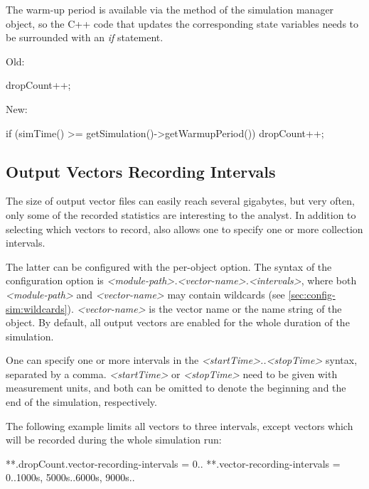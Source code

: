 The warm-up period is available via the  method of the
simulation manager object, so the C++ code that updates the corresponding state
variables needs to be surrounded with an \textit{if} statement.

Old:

\begin{cpp}
dropCount++;
\end{cpp}

New:

\begin{cpp}
if (simTime() >= getSimulation()->getWarmupPeriod())
    dropCount++;
\end{cpp}


\subsection{Output Vectors Recording Intervals}
\label{sec:ana-sim:vector-recording-intervals}

The size of output vector files can easily reach several gigabytes, but very
often, only some of the recorded statistics are interesting to the analyst. In
addition to selecting which vectors to record, {\opp} also allows one to specify
one or more collection intervals.

The latter can be configured with the 
per-object option. The syntax of the configuration option is
\textit{<module-path>.<vector-name>.}\textit{<intervals>},
where both \textit{<module-path>} and \textit{<vector-name>} may contain
wildcards (see \ref{sec:config-sim:wildcards}). \textit{<vector-name>} is the
vector name or the name string of the  object. By default, all
output vectors are enabled for the whole duration of the simulation.

One can specify one or more intervals in the \textit{<startTime>..<stopTime>}
syntax, separated by a comma. \textit{<startTime>} or \textit{<stopTime>} need
to be given with measurement units, and both can be omitted to denote the
beginning and the end of the simulation, respectively.

The following example limits all vectors to three intervals, except
 vectors which will be recorded during the whole simulation run:

\begin{inifile}
**.dropCount.vector-recording-intervals = 0..
**.vector-recording-intervals = 0..1000s, 5000s..6000s, 9000s..
\end{inifile}

